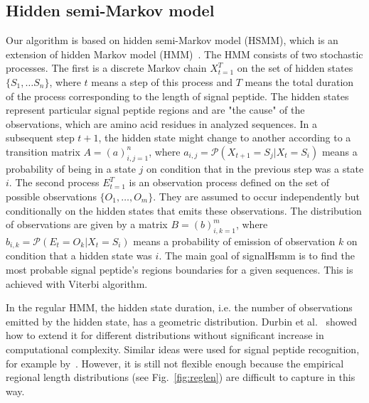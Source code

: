 \documentclass[10pt,letterpaper]{article}
\begin{document}
\subsection*{Hidden semi-Markov model}
Our algorithm is based on hidden semi-Markov model (HSMM), which is an extension of hidden Markov model (HMM)~\cite{1989rabinera, Yu2010215, koski_hidden_2001}. The HMM consists of two stochastic processes. The first is a discrete Markov chain $X_{t=1}^T$ on the set of  hidden states $\{S_1, \dots S_n\}$, where $t$ means a step of this process and $T$ means the total duration of the process corresponding to the length of signal peptide. The hidden states represent particular signal peptide regions and are "the cause" of the observations, which are amino acid residues in analyzed sequences. In a subsequent step $t+1$, the hidden state might change to another according to a transition matrix $A = (a)_{i,j=1}^n$, where $a_{i,j} = \mathcal{P}(X_{t+1} = S_j | X_t = S_i)$ means a probability of being in a state $j$ on condition that in the previous step was a state $i$. The second process $E_{t=1}^T$ is an observation process defined on the set of possible observations $\{O_1, \dots, O_m\}$. They are assumed to occur independently but conditionally on the hidden states that emits these observations. 
The distribution of observations are given by a matrix $B = (b)_{i,k=1}^m$, where $b_{i,k} = \mathcal{P}(E_t = O_k | X_t = S_i)$ means a probability of emission of observation $k$ on condition that a hidden state was $i$.
The main goal of signalHsmm is to find the most probable signal peptide's regions boundaries for a given sequences. This is achieved with Viterbi algorithm.

In the regular HMM, the hidden state duration, i.e. the number of observations emitted by the hidden state, has a geometric distribution. Durbin et al.~\cite{Durbin98} showed how to extend it for different distributions without significant increase in computational 
complexity. Similar ideas were used for signal peptide recognition, for example by~\cite{2004klla}. However, it is still not flexible enough because the empirical regional length distributions (see Fig.~\ref{fig:reglen}) are difficult to capture in this way.
\end{document}
